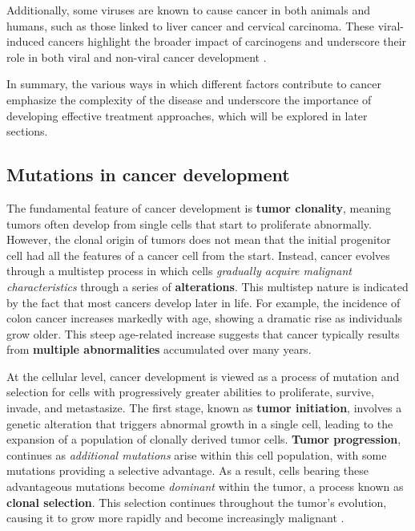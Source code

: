 Additionally, some viruses are known to cause cancer in both animals and humans, such as those linked to liver cancer and cervical carcinoma. These viral-induced cancers highlight the broader impact of carcinogens and underscore their role in both viral and non-viral cancer development \cite{nih_cancer_dev}.

In summary, the various ways in which different factors contribute to cancer emphasize the complexity of the disease and underscore the importance of developing effective treatment approaches, which will be explored in later sections.

\subsection{Mutations in cancer development}

The fundamental feature of cancer development is \textbf{tumor clonality}, meaning tumors often develop from single cells that start to proliferate abnormally. However, the clonal origin of tumors does not mean that the initial progenitor cell had all the features of a cancer cell from the start. Instead, cancer evolves through a multistep process in which cells \textit{gradually acquire malignant characteristics} through a series of \textbf{alterations}. This multistep nature is indicated by the fact that most cancers develop later in life. For example, the incidence of colon cancer increases markedly with age, showing a dramatic rise as individuals grow older. This steep age-related increase suggests that cancer typically results from \textbf{multiple abnormalities} accumulated over many years.

At the cellular level, cancer development is viewed as a process of mutation and selection for cells with progressively greater abilities to proliferate, survive, invade, and metastasize. The first stage, known as \textbf{tumor initiation}, involves a genetic alteration that triggers abnormal growth in a single cell, leading to the expansion of a population of clonally derived tumor cells. \textbf{Tumor progression}, continues as \textit{additional mutations} arise within this cell population, with some mutations providing a selective advantage. As a result, cells bearing these advantageous mutations become \textit{dominant} within the tumor, a process known as \textbf{clonal selection}. This selection continues throughout the tumor's evolution, causing it to grow more rapidly and become increasingly malignant \cite{nih_cancer_dev}.

